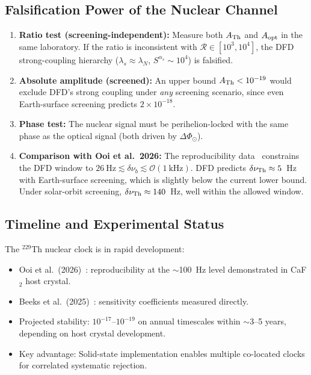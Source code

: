 \documentclass[twocolumn,showpacs,preprintnumbers,amsmath,amssymb,prd]{revtex4-2}
\begin{document}
\subsection{Falsification Power of the Nuclear Channel}

\begin{enumerate}
\item \textbf{Ratio test (screening-independent):} Measure both
  $A_{\rm Th}$ and $A_{\rm opt}$ in the same laboratory.  If the
  ratio is inconsistent with $\mathcal{R} \in [10^3, 10^4]$, the
  DFD strong-coupling hierarchy ($\lambda_s \approx \lambda_N$,
  $S^{\alpha_s} \sim 10^4$) is falsified.

\item \textbf{Absolute amplitude (screened):} An upper bound
  $A_{\rm Th} < 10^{-19}$ would exclude DFD's strong coupling under
  \emph{any} screening scenario, since even Earth-surface screening
  predicts $2 \times 10^{-18}$.

\item \textbf{Phase test:} The nuclear signal must be perihelion-locked
  with the same phase as the optical signal (both driven by
  $\Delta\Phi_\odot$).

\item \textbf{Comparison with Ooi et al.\ 2026:} The reproducibility
  data~\cite{Ooi2026} constrains the DFD window to
  $26~\text{Hz} \lesssim \delta\nu_b \lesssim \mathcal{O}(1~\text{kHz})$.
  DFD predicts $\delta\nu_{\rm Th} \approx 5$~Hz with Earth-surface
  screening, which is slightly below the current lower bound.
  Under solar-orbit screening, $\delta\nu_{\rm Th} \approx 140$~Hz,
  well within the allowed window.
\end{enumerate}

\subsection{Timeline and Experimental Status}

The $^{229}$Th nuclear clock is in rapid development:
\begin{itemize}
\item Ooi et al.\ (2026)~\cite{Ooi2026}: reproducibility at the
  $\sim$100~Hz level demonstrated in CaF$_2$ host crystal.
\item Beeks et al.\ (2025)~\cite{Beeks2025}: sensitivity
  coefficients measured directly.
\item Projected stability: $10^{-17}$--$10^{-19}$ on annual
  timescales within $\sim$3--5 years, depending on host crystal
  development.
\item Key advantage: Solid-state implementation enables multiple
  co-located clocks for correlated systematic rejection.
\end{itemize}
\end{document}
